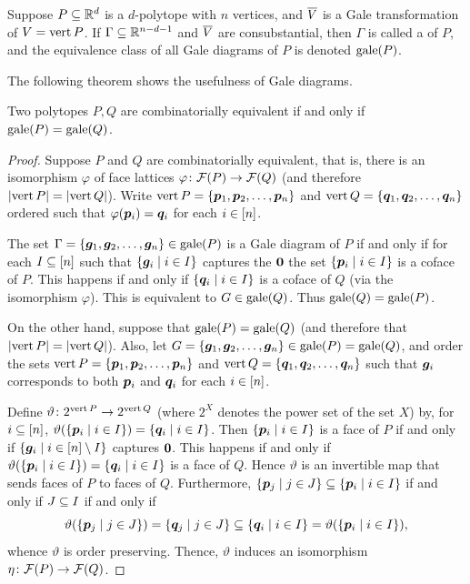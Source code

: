 \begin{Definition}
    Suppose \(P\subseteq\mathbb{R}^{d}\) is a \(d\)-polytope with \(n\) vertices, and \(\overline{V}\) is a Gale transformation of \(V=\operatorname{vert} P\).  If \(\Gamma\subseteq\mathbb{R}^{n-d-1}\) and \(\overline{V}\) are consubstantial, then \(\Gamma\) is called a  of \(P\), and the equivalence class of all Gale diagrams of \(P\) is denoted \(\operatorname{gale}(P)\).
\end{Definition}

The following theorem shows the usefulness of Gale diagrams.

\begin{Theorem}
    Two polytopes \(P, Q\) are combinatorially equivalent if and only if \(\operatorname{gale}(P)=\operatorname{gale}(Q)\).
\end{Theorem}
\begin{proof}
    Suppose \(P\) and \(Q\) are combinatorially equivalent, that is, there is an isomorphism \(\varphi\) of face lattices \(\varphi\colon\mathcal{F}(P)\rightarrow\mathcal{F}(Q)\) (and therefore \(\left\lvert\operatorname{vert} P\right\rvert=\left\lvert\operatorname{vert} Q\right\rvert\)).  Write \(\operatorname{vert} P=\left\{\bm{p}_1,\bm{p}_2,\dotsc,\bm{p}_n\right\}\) and \(\operatorname{vert} Q=\left\{\bm{q}_1,\bm{q}_2,\dotsc,\bm{q}_n\right\}\) ordered such that \(\varphi(\bm{p}_i)=\bm{q}_i\) for each \(i\in\left[n\right]\).

    The set \(\Gamma=\left\{\bm{g}_1,\bm{g}_2,\dotsc,\bm{g}_n\right\}\in\operatorname{gale}(P)\) is a Gale diagram of \(P\) if and only if for each \(I\subseteq\left[n\right]\) such that \(\setb{\ve g_i}{i\in I}\) captures the \(\bm{0}\) the set \(\setb{\ve p_i}{i\in I}\) is a coface of \(P\).  This happens if and only if \(\setb{\ve q_i}{i\in I}\) is a coface of \(Q\) (via the isomorphism \(\varphi\)).  This is equivalent to  \(G\in\operatorname{gale}(Q)\). Thus \(\operatorname{gale}(Q)=\operatorname{gale}(P)\).

    On the other hand, suppose that \(\operatorname{gale}(P)=\operatorname{gale}(Q)\) (and therefore that \(\left\lvert\operatorname{vert} P\right\rvert=\left\lvert\operatorname{vert} Q\right\rvert\)).  Also, let \(G=\left\{\bm{g}_1,\bm{g}_2,\dotsc,\bm{g}_n\right\}\in\operatorname{gale}(P)=\operatorname{gale}(Q)\), and order the sets  \(\operatorname{vert} P=\left\{\bm{p}_1,\bm{p}_2,\dotsc,\bm{p}_n\right\}\) and \(\operatorname{vert} Q=\left\{\bm{q}_1,\bm{q}_2,\dotsc,\bm{q}_n\right\}\) such that \(\bm{g}_i\) corresponds to both \(\bm{p}_i\) and \(\bm{q}_i\) for each \(i\in\left[n\right]\).

    Define \(\vartheta\colon2^{\operatorname{vert} P}\rightarrow2^{\operatorname{vert} Q}\) (where \(2^X\) denotes the power set of the set \(X\)) by, for \(i\subseteq\left[n\right]\), \(\vartheta(\setb{\ve p_i}{i\in I})=\setb{\ve q_i}{i\in I}\).  Then \(\setb{\ve p_i}{i\in I}\) is a face of \(P\) if and only if \(\setb{\ve g_i}{i\in\brac n\setminus I}\) captures \(\bm{0}\).  This happens if and only if \(\vartheta(\setb{\ve p_i}{i\in I})=\setb{\ve q_i}{i\in I}\) is a face of \(Q\).  Hence \(\vartheta\) is an invertible map that sends faces of \(P\) to faces of \(Q\).  Furthermore, \(\setb{\ve p_j}{j\in J}\sbset\setb{\ve p_i}{i\in I}\) if and only if \(J\subseteq I\) if and only if
        \[
            \vartheta(\setb{\ve p_j}{j\in J})
                =       \setb{\ve q_j}{j\in J}
                \sbset  \setb{\ve q_i}{i\in I}
                =       \vartheta(\setb{\ve p_i}{i\in I}),
        \]
    whence \(\vartheta\) is order preserving.  Thence, \(\vartheta\) induces an isomorphism \(\eta\colon\mathcal{F}(P)\rightarrow\mathcal{F}(Q)\).
\end{proof}

